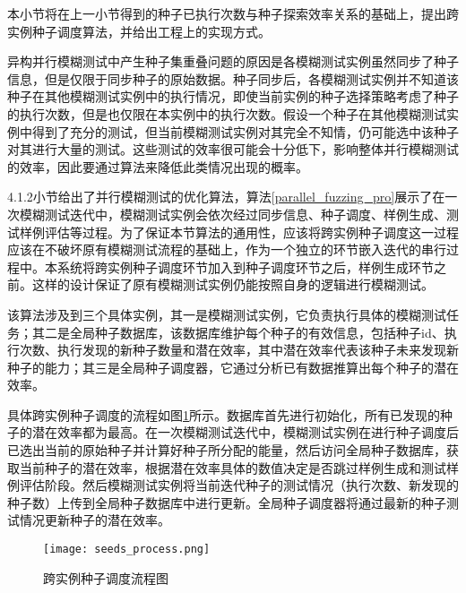 \documentclass[master]{thesis-uestc}
\begin{document}
本小节将在上一小节得到的种子已执行次数与种子探索效率关系的基础上，提出跨实例种子调度算法，并给出工程上的实现方式。

异构并行模糊测试中产生种子集重叠问题的原因是各模糊测试实例虽然同步了种子信息，但是仅限于同步种子的原始数据。种子同步后，各模糊测试实例并不知道该种子在其他模糊测试实例中的执行情况，即使当前实例的种子选择策略考虑了种子的执行次数，但是也仅限在本实例中的执行次数。假设一个种子在其他模糊测试实例中得到了充分的测试，但当前模糊测试实例对其完全不知情，仍可能选中该种子对其进行大量的测试。这些测试的效率很可能会十分低下，影响整体并行模糊测试的效率，因此要通过算法来降低此类情况出现的概率。

4.1.2小节给出了并行模糊测试的优化算法，算法\ref{parallel_fuzzing_pro}展示了在一次模糊测试迭代中，模糊测试实例会依次经过同步信息、种子调度、样例生成、测试样例评估等过程。为了保证本节算法的通用性，应该将跨实例种子调度这一过程应该在不破坏原有模糊测试流程的基础上，作为一个独立的环节嵌入迭代的串行过程中。本系统将跨实例种子调度环节加入到种子调度环节之后，样例生成环节之前。这样的设计保证了原有模糊测试实例仍能按照自身的逻辑进行模糊测试。

该算法涉及到三个具体实例，其一是模糊测试实例，它负责执行具体的模糊测试任务；其二是全局种子数据库，该数据库维护每个种子的有效信息，包括种子id、执行次数、执行发现的新种子数量和潜在效率，其中潜在效率代表该种子未来发现新种子的能力；其三是全局种子调度器，它通过分析已有数据推算出每个种子的潜在效率。

具体跨实例种子调度的流程如图\ref{seeds_process}所示。数据库首先进行初始化，所有已发现的种子的潜在效率都为最高。在一次模糊测试迭代中，模糊测试实例在进行种子调度后已选出当前的原始种子并计算好种子所分配的能量，然后访问全局种子数据库，获取当前种子的潜在效率，根据潜在效率具体的数值决定是否跳过样例生成和测试样例评估阶段。然后模糊测试实例将当前迭代种子的测试情况（执行次数、新发现的种子数）上传到全局种子数据库中进行更新。全局种子调度器将通过最新的种子测试情况更新种子的潜在效率。

\begin{figure}[!htbp]
    \vspace{6pt}
    \centering
    \texttt{[image: seeds\_process.png]}
    \caption{跨实例种子调度流程图}
    \label{seeds_process}
\end{figure}
\end{document}
